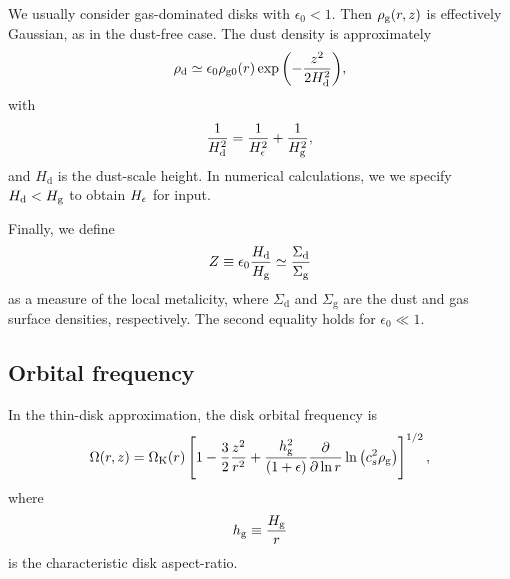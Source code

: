 We usually consider gas-dominated disks with $\epsilon_0 < 1$.  
Then $\rho_\mathrm{g}(r,z)$ is effectively Gaussian, as in the 
dust-free case. The dust density is approximately 
\begin{align}
  \rho_\mathrm{d} \simeq \epsilon_0\rho_\mathrm{g0}(r) \exp
        {\left(-\frac{z^2}{2H_\mathrm{d}^2}\right)}, 
\end{align}
with 
\begin{align}
  \frac{1}{H_\mathrm{d}^2} = \frac{1}{H_\epsilon^2} + \frac{1}{H_\mathrm{g}^2}, 
\end{align}
and $H_\mathrm{d}$ is the dust-scale height. In numerical
calculations, we  we specify $H_\mathrm{d}< H_\mathrm{g}$ to obtain 
$H_\epsilon$ for input. 

Finally, we define 
\begin{align}
  Z \equiv \epsilon_0\frac{H_\mathrm{d}}{H_\mathrm{g}} \simeq
  \frac{\Sigma_\mathrm{d}}{\Sigma_\mathrm{g}} 
\end{align}
as a measure of the local metalicity, where $\Sigma_\mathrm{d}$ and
$\Sigma_\mathrm{g}$ are the dust and gas surface densities,
respectively. The second equality holds for $\epsilon_0\ll1$.  


\subsection{Orbital frequency} 
In the thin-disk approximation, the disk orbital frequency is 
\begin{align}
  \Omega(r,z) = \Omega_{\rm K}(r)\left[1 - \frac{3}{2}\frac{z^2}{r^2} +
    \frac{h_\mathrm{g}^2}{\left(1+\epsilon\right)}\frac{\partial}{\partial\ln{r}}\ln{\left(c_s^2\rho_\mathrm{g}\right)}
    \right]^{1/2}, 
\end{align}
where 
\begin{align}
  h_\mathrm{g} \equiv \frac{H_\mathrm{g}}{r}
\end{align}
is the characteristic disk aspect-ratio. 

